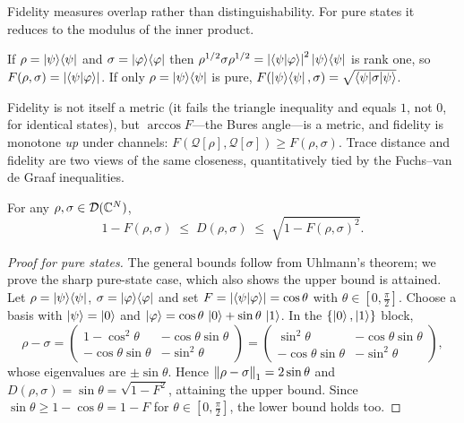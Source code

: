 Fidelity measures overlap rather than distinguishability. For pure states it
reduces to the modulus of the inner product.

\begin{example}\label{exa:lec02-purefid}
If $\rho=\ket{\psi}\!\bra{\psi}$ and $\sigma=\ket{\varphi}\!\bra{\varphi}$ then
$\rho^{1/2}\sigma\rho^{1/2}=\left\lvert \braket{\psi|\varphi} \right\rvert^{2}\ket{\psi}\!\bra{\psi}$ is
rank one, so $F(\rho,\sigma)=\left\lvert \braket{\psi|\varphi} \right\rvert$. If only $\rho=\ket{\psi}\!\bra{\psi}$
is pure, $F(\ket{\psi}\!\bra{\psi},\sigma)=\sqrt{\braket{\psi|\sigma|\psi}}$.
\end{example}

Fidelity is not itself a metric (it fails the triangle inequality and equals $1$,
not $0$, for identical states), but $\arccos F$---the Bures angle---is a metric,
and fidelity is monotone \emph{up} under channels:
$F(\mathcal{Q}[\rho],\mathcal{Q}[\sigma])\ge F(\rho,\sigma)$. Trace distance and
fidelity are two views of the same closeness, quantitatively tied by the
Fuchs--van de Graaf inequalities.

\begin{theorem}\label{thm:lec02-fvdg}
For any $\rho,\sigma\in\mathcal{D}(\mathbb{C}^{N})$,
\begin{equation}\label{eq:lec02-fvdg}
  1-F(\rho,\sigma)\;\le\;D(\rho,\sigma)\;\le\;\sqrt{1-F(\rho,\sigma)^{2}} .
\end{equation}
\end{theorem}

\begin{proof}[Proof for pure states]
The general bounds follow from Uhlmann's theorem; we prove the sharp pure-state
case, which also shows the upper bound is attained. Let $\rho=\ket{\psi}\!\bra{\psi}$,
$\sigma=\ket{\varphi}\!\bra{\varphi}$ and set $F=\left\lvert \braket{\psi|\varphi} \right\rvert=\cos\theta$ with
$\theta\in[0,\tfrac\pi2]$. Choose a basis with $\ket{\psi}=\ket{0}$ and
$\ket{\varphi}=\cos\theta\,\ket{0}+\sin\theta\,\ket{1}$. In the
$\{\ket{0},\ket{1}\}$ block,
\[
  \rho-\sigma=\begin{pmatrix}1-\cos^{2}\theta&-\cos\theta\sin\theta\\
  -\cos\theta\sin\theta&-\sin^{2}\theta\end{pmatrix}
  =\begin{pmatrix}\sin^{2}\theta&-\cos\theta\sin\theta\\
  -\cos\theta\sin\theta&-\sin^{2}\theta\end{pmatrix},
\]
whose eigenvalues are $\pm\sin\theta$. Hence
$\left\lVert \rho-\sigma \right\rVert_1=2\sin\theta$ and $D(\rho,\sigma)=\sin\theta=\sqrt{1-F^{2}}$,
attaining the upper bound. Since $\sin\theta\ge1-\cos\theta=1-F$ for
$\theta\in[0,\tfrac\pi2]$, the lower bound holds too.
\end{proof}

